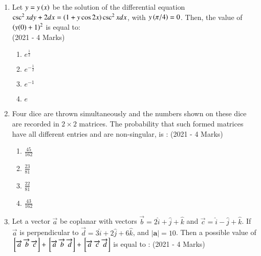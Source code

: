 \documentclass[journal]{IEEEtran}
\begin{document}
\begin{enumerate}
{        }
    \item{
     
            Let $y=y\left(x\right)$ be the solution of the differential equation $\csc^2x dy + 2dx = \left(1+y \cos 2x\right) \csc^2x dx$, with $y\left(\pi/4\right) = 0$. Then, the value of $\left(y(0)+1\right)^2$ is equal to: \\ \text{ }
            \hfill
            {(2021 - 4 Marks)}
            \begin{multicols}{4}
                \begin{enumerate}
                	\item $e^\frac{1}{2}$
                	\item $e^{-\frac{1}{2}}$
                	\item $e^{-1}$
                	\item $e$
                \end{enumerate}
            \end{multicols}
        
        }
    \item{
            Four dice are thrown simultaneously and the numbers shown on these dice are recorded in $2\times 2$
            matrices. The probability that such formed matrices have all different entries and are non-singular, is :
           	\hfill
                {(2021 - 4 Marks)}
            
            \begin{multicols}{4}
				\begin{enumerate}
					\item $\frac{45}{162}$
					\item $\frac{23}{81}$
					\item $\frac{22}{81}$
					\item $\frac{43}{162}$
				\end{enumerate}
			\end{multicols}
        
        }
 	\item{
        	Let a vector $\overrightarrow{a}$ be coplanar with vectors $\overrightarrow{b} = 2\hat{i} + \hat{j}  + \hat{k} $ and $\overrightarrow{c} = \hat{i}  - \hat{j}  + \hat{k} $. If $\overrightarrow{a}$ is perpendicular to $\overrightarrow{d} = 3\hat{i} + 2\hat{j} + 6\hat{k}$, and $|\textbf{a}| = 10$. Then a possible value of ${}\left[\overrightarrow{a}\text{ }\overrightarrow{b}\text{ }\overrightarrow{c}\right]+{}\left[\overrightarrow{a}\text{ }\overrightarrow{b}\text{ }\overrightarrow{d}\right]+{}\left[\overrightarrow{a}\text{ }\overrightarrow{c}\text{ }\overrightarrow{d}\right] $ is equal to :\text{ }
        	\hfill
        	{(2021 - 4 Marks)}
        	
}
\end{enumerate}
\end{document}
